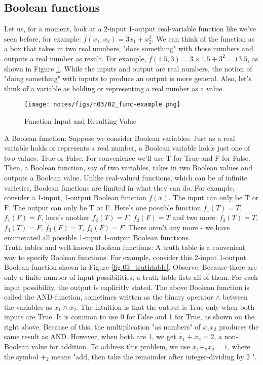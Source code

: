 \documentclass[main.tex]{subfiles}
\begin{document}
\subsection{Boolean functions}

Let us, for a moment, look at a 2-input 1-output real-variable function like we've seen before, for example: $f\left(x_{1}, x_{2}\right)=3 x_{1}+x_{2}^{2}$. We can think of the function as a box that takes in two real numbers, "does something" with those numbers and outputs a real number as result. For example, $f(1.5,3)=3 \times 1.5+3^{2}=13.5$, as shown in Figure \ref{fig:02_func-example}. While the inputs and output are real numbers, the notion of "doing something" with inputs to produce an output is more general. Also, let's think of a variable as holding or representing a real number as a value.\\

\begin{figure}
    \centering
    \texttt{[image: notes/figs/n03/02\_func-example.png]}
    \caption{Function Input and Resulting Value}
    \label{fig:02_func-example}
\end{figure}

A Boolean function: Suppose we consider Boolean variables: Just as a real variable holds or represents a real number, a Boolean variable holds just one of two values: True or False. For convenience we'll use T for True and F for False. Then, a Boolean function, say of two variables, takes in two Boolean values and outputs a Boolean value. Unlike real-valued functions, which can be of infinite varieties, Boolean functions are limited in what they can do. For example, consider a 1-input, 1-output Boolean function $f(x)$. The input can only be $\mathrm{T}$ or $\mathrm{F}$. The output can only be T or F. Here's one possible function
$f_{1}(T)=T$, $f_{1}(F)=F$, here's another $f_{2}(T)=F$, $f_{2}(F)=T$ and two more:
$f_{3}(T) =T$, $f_{4}(T) =F$, $f_{3}(F) =T$, $f_{4}(F) =F$. There aren't any more - we have enumerated all possible 1-input 1-output Boolean functions.\\

Truth tables and well-known Boolean functions: A truth table is a convenient way to specify Boolean functions. For example, consider this 2-input 1-output Boolean function shown in Figure \ref{fig:03_truthtable}. Observe: Because there are only a finite number of input possibilities, a truth table lists all of them. For each input possibility, the output is explicitly stated. The above Boolean function is called the AND-function, sometimes written as the binary operator $\wedge$ between the variables as $x_{1} \wedge x_{2}$. The intuition is that the output is True only when both inputs are True. It is common to use 0 for False and 1 for True, as shown on the right above. Because of this, the multiplication "as numbers" of $x_{1} x_{2}$ produces the same result as AND. However, when both are 1, we get $x_{1}+x_{2}=2$, a non-Boolean value for addition. To address this problem, we use $x_{1}+_{2} x_{2}=1$, where the symbol $+_{2}$ means "add, then take the remainder after integer-dividing by 2 ".\\
\end{document}
